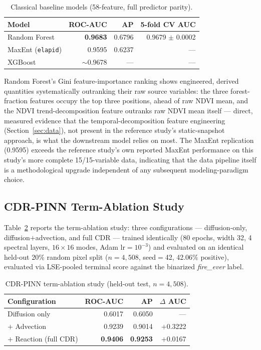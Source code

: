 \documentclass[journal]{IEEEtran}
\begin{document}
\begin{table}[t]
\centering
\caption{Classical baseline models (58-feature, full predictor parity).}
\label{tab:classical}
\begin{tabular}{lrrr}
\toprule
\textbf{Model} & \textbf{ROC-AUC} & \textbf{AP} & \textbf{5-fold CV AUC} \\
\midrule
Random Forest & \textbf{0.9683} & 0.6796 & 0.9679 $\pm$ 0.0002 \\
MaxEnt (\texttt{elapid}) & 0.9595 & 0.6237 & --- \\
XGBoost & $\sim$0.9678 & --- & --- \\
\bottomrule
\end{tabular}
\end{table}

Random Forest's Gini feature-importance ranking shows engineered, derived quantities systematically outranking their raw source variables: the three forest-fraction features occupy the top three positions, ahead of raw NDVI mean, and the NDVI trend-decomposition feature outranks raw NDVI mean itself --- direct, measured evidence that the temporal-decomposition feature engineering (Section~\ref{sec:data}), not present in the reference study's static-snapshot approach, is what the downstream model relies on most. The MaxEnt replication (0.9595) exceeds the reference study's own reported MaxEnt performance on this study's more complete 15/15-variable data, indicating that the data pipeline itself is a methodological upgrade independent of any subsequent modeling-paradigm choice.

\subsection{CDR-PINN Term-Ablation Study}

Table~\ref{tab:ablation} reports the term-ablation study: three configurations --- diffusion-only, diffusion$+$advection, and full CDR --- trained identically (80 epochs, width 32, 4 spectral layers, $16\times16$ modes, Adam $\mathrm{lr}=10^{-3}$) and evaluated on an identical held-out 20\% random pixel split ($n=4{,}508$, seed$=$42, 42.06\% positive), evaluated via LSE-pooled terminal score against the binarized \emph{fire\_ever} label.

\begin{table}[t]
\centering
\caption{CDR-PINN term-ablation study (held-out test, $n=4{,}508$).}
\label{tab:ablation}
\begin{tabular}{lrrr}
\toprule
\textbf{Configuration} & \textbf{ROC-AUC} & \textbf{AP} & \textbf{$\Delta$ AUC} \\
\midrule
Diffusion only & 0.6017 & 0.6050 & --- \\
$+$ Advection & 0.9239 & 0.9014 & $+$0.3222 \\
$+$ Reaction (full CDR) & \textbf{0.9406} & \textbf{0.9253} & $+$0.0167 \\
\bottomrule
\end{tabular}
\end{table}
\end{document}
